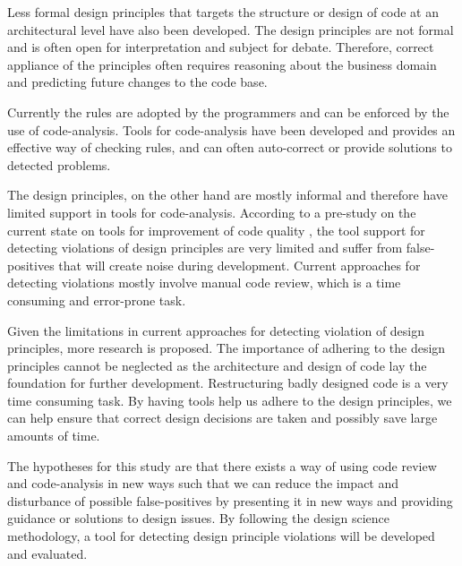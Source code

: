 \documentclass{report}
\begin{document}
Less formal design principles that targets the structure or design of code at an architectural level have also been developed. The design principles are not formal and is often open for interpretation and subject for debate. Therefore, correct appliance of the principles often requires reasoning about the business domain and predicting future changes to the code base. %

Currently the rules are adopted by the programmers and can be enforced by the use of code-analysis. Tools for code-analysis have been developed and provides an effective way of checking rules, and can often auto-correct or provide solutions to detected problems.  

The design principles, on the other hand are mostly informal and therefore have limited support in tools for code-analysis. According to a pre-study on the current state on tools for improvement of code quality \cite{prestudy}, the tool support for detecting violations of design principles are very limited and suffer from false-positives that will create noise during development. Current approaches for detecting violations mostly involve manual code review, which is a time consuming and error-prone task.

Given the limitations in current approaches for detecting violation of design principles, more research is proposed. The importance of adhering to the design principles cannot be neglected as the architecture and design of code lay the foundation for further development. Restructuring badly designed code is a very time consuming task. By having tools help us adhere to the design principles, we can help ensure that correct design decisions are taken and possibly save large amounts of time.  

The hypotheses for this study are that there exists a way of using code review and code-analysis in new ways such that we can reduce the impact and disturbance of possible false-positives by presenting it in new ways and providing guidance or solutions to design issues. By following the design science methodology, a tool for detecting design principle violations will be developed and evaluated. 
\end{document}
